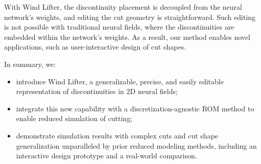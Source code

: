 
With Wind Lifter, the discontinuity placement is decoupled from the neural network's weights, and editing the cut geometry is straightforward. Such editing is not possible with traditional neural fields, where the discontinuities are embedded within the network's weights. As a result, our method enables novel applications, such as user-interactive design of cut shapes. 


In summary, we:
\begin{itemize}
    \item introduce Wind Lifter, a generalizable, precise, and easily editable representation of discontinuities in 2D neural fields; 
    \item integrate this new capability with a discretization-agnostic ROM method to enable reduced simulation of cutting;
    \item demonstrate simulation results with complex cuts and cut shape generalization unparalleled by prior reduced modeling methods, including an interactive design prototype and a real-world comparison.
\end{itemize}









